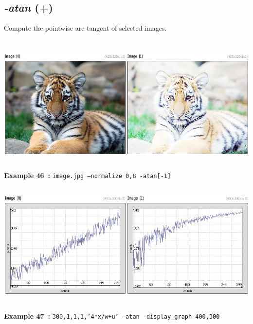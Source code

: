 \documentclass[a4paper,11pt,twoside]{book}
\begin{document}
\subsection{\emph{-atan} (+)}\vspace*{-0.5em}
Compute the pointwise arc-tangent of selected images.
\begin{center}\includegraphics[keepaspectratio=true,height=7cm,width=\textwidth]{img/gmic_def46.jpg}\\
{\footnotesize \textbf{Example 46~:} \texttt{image.jpg --normalize 0,8 -atan[-1]}}
\\\includegraphics[keepaspectratio=true,height=7cm,width=\textwidth]{img/gmic_def47.jpg}\\
{\footnotesize \textbf{Example 47~:} \texttt{300,1,1,1,'4*x/w+u' --atan -display\_graph 400,300}}
\end{center}
\end{document}
